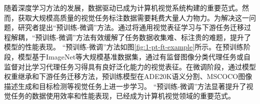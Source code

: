 随着深度学习方法的发展，数据驱动已成为计算机视觉系统构建的重要范式。然而，获取大规模高质量的视觉任务标注数据需要耗费大量人力物力。为解决这一问题，研究者提出“预训练-微调”方法。通过将通用视觉表征学习与下游任务迁移过程解耦，“预训练-微调”方法有效缓解了任务数据收集难、标注贵的难题，提升了模型的性能表现。
“预训练-微调”方法如图\ref{fig:1-pt-ft-example}所示。在预训练阶段，模型基于ImageNet\cite{deng2009imagenet}等大规模基准数据集，通过有监督图像分类代理任务\cite{alexnet}或自监督对比学习代理任务\cite{chen2020simple}习得具有良好泛化能力的视觉表征。在微调阶段，通过模型权重继承和下游任务迁移方法，预训练模型在ADE20K语义分割\cite{zhou2019ade}、MSCOCO图像描述生成和目标检测\cite{chen2015microsoft}等视觉任务上进一步学习。
“预训练-微调”方法显著提升了视觉任务的数据使用效率和性能表现，已经成为计算机视觉领域的重要范式。


